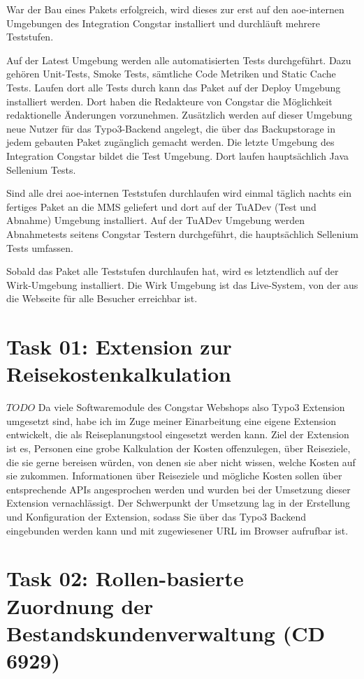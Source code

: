 \documentclass[11pt,a4paper]{article} %
\begin{document}
War der Bau eines Pakets erfolgreich, wird dieses zur erst auf den aoe-internen Umgebungen des Integration Congstar installiert und durchläuft mehrere Teststufen.

Auf der Latest Umgebung werden alle automatisierten Tests durchgeführt. Dazu gehören Unit-Tests, Smoke Tests, sämtliche Code Metriken und Static Cache Tests. Laufen dort alle Tests durch kann das Paket auf der Deploy Umgebung installiert werden. Dort haben die Redakteure von Congstar die Möglichkeit redaktionelle Änderungen vorzunehmen. Zusätzlich werden auf dieser Umgebung neue Nutzer für das Typo3-Backend angelegt, die über das Backupstorage in jedem gebauten Paket zugänglich gemacht werden. Die letzte Umgebung des Integration Congstar bildet die Test Umgebung. Dort laufen hauptsächlich Java Sellenium Tests.

Sind alle drei aoe-internen Teststufen durchlaufen wird einmal täglich nachts ein fertiges Paket an die MMS geliefert und dort auf der TuADev (Test und Abnahme) Umgebung installiert. Auf der TuADev Umgebung werden Abnahmetests seitens Congstar Testern durchgeführt, die hauptsächlich Sellenium Tests umfassen.

Sobald das Paket alle Teststufen durchlaufen hat, wird es letztendlich auf der Wirk-Umgebung installiert. 
Die Wirk Umgebung ist das Live-System, von der aus die Webseite für alle Besucher erreichbar ist.


\section{Task 01: Extension zur Reisekostenkalkulation} \label{sec:pipeline}

$TODO$
Da viele Softwaremodule des Congstar Webshops also Typo3 Extension umgesetzt sind, habe ich im Zuge 
meiner Einarbeitung eine eigene Extension entwickelt, die als Reiseplanungstool eingesetzt werden kann.
Ziel der Extension ist es, Personen eine grobe Kalkulation der Kosten offenzulegen, über Reiseziele, 
die sie gerne bereisen würden, von denen sie aber nicht wissen, welche Kosten auf sie zukommen. 
Informationen über Reiseziele und mögliche Kosten sollen über entsprechende APIs angesprochen werden und wurden bei der Umsetzung dieser Extension vernachlässigt.
Der Schwerpunkt der Umsetzung lag in der Erstellung und Konfiguration der Extension, sodass Sie über das
Typo3 Backend eingebunden werden kann und mit zugewiesener URL im Browser aufrufbar ist.

\section{Task 02: Rollen-basierte Zuordnung der Bestandskundenverwaltung (CD 6929)} \label{sec:t02}
\end{document}
